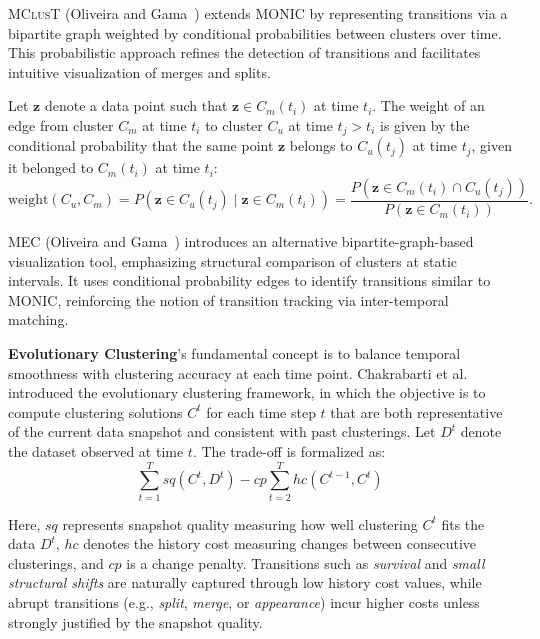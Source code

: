 \textsc{MClusT} (Oliveira and Gama~\cite{mclust}) extends MONIC by representing transitions via a
bipartite graph weighted by conditional probabilities between clusters over time.
This probabilistic approach refines the detection of transitions and facilitates intuitive
visualization of merges and splits.

Let $ \mathbf{z} $ denote a data point such that $ \mathbf{z} \in C_m(t_i) $ at
time $ t_i $. The weight of an edge from cluster $ C_m $ at time $ t_i $ to
cluster $ C_u $ at time $ t_j > t_i $ is given by the conditional probability
that the same point $ \mathbf{z} $ belongs to $ C_u(t_j) $ at time $ t_j $,
given it belonged to $ C_m(t_i) $ at time $ t_i $:
\begin{equation}
    \text{weight}(C_u, C_m) = P(\mathbf{z} \in C_u(t_j) \mid \mathbf{z} \in C_m(t_i)) =
    \frac{P(\mathbf{z} \in C_m(t_i) \cap C_u(t_j))}{P(\mathbf{z} \in C_m(t_i))}.
\end{equation}

\textsc{MEC} (Oliveira and Gama~\cite{mec}) introduces an alternative bipartite-graph-based visualization
tool, emphasizing structural comparison of clusters at static intervals. It uses conditional
probability edges to identify transitions similar to MONIC, reinforcing the notion of transition
tracking via inter-temporal matching.

\textbf{Evolutionary Clustering}'s fundamental concept is to balance temporal smoothness
with clustering accuracy at each time point. Chakrabarti et al.~\cite{evolutionary_clustering}
introduced the evolutionary clustering framework, in which the objective is to compute clustering
solutions $ C^t $ for each time step $ t $ that are both representative of the current data snapshot
and consistent with past clusterings. Let $ D^t $ denote the dataset observed at time $ t $.
The trade-off is formalized as:
\begin{equation}
    \sum_{t=1}^T sq(C^t, D^t) - cp \sum_{t=2}^T hc(C^{t-1}, C^t)
\end{equation}

Here, $ sq $ represents snapshot quality measuring how well clustering $ C^t $
fits the data $ D^t $, $ hc $ denotes the history cost measuring changes
between consecutive clusterings, and $ cp $ is a change penalty. Transitions
such as \textit{survival} and \textit{small structural shifts} are naturally
captured through low history cost values, while abrupt transitions (e.g.,
\textit{split}, \textit{merge}, or \textit{appearance}) incur higher costs
unless strongly justified by the snapshot quality.

